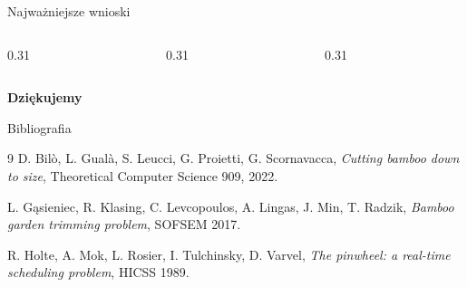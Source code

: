 \documentclass[aspectratio=169,10pt]{beamer}
\newcommand{\callout}[4]{%
  \node[
    rounded corners=6pt,
    fill=#1,
    draw=#2,
    line width=0.7pt,
    text width=#3,
    align=left,
    inner sep=8pt
  ] {#4};
}
\begin{document}
\begin{frame}{Najważniejsze wnioski}
  \vspace{0.35cm}
  \begin{columns}[T,onlytextwidth]
    \begin{column}{0.31\textwidth}
    \end{column}
    \begin{column}{0.31\textwidth}
    \end{column}
    \begin{column}{0.31\textwidth}
    \end{column}
  \end{columns}

  \vspace{0.82cm}
  \centering
  {\Large\bfseries Dziękujemy}
\end{frame}

\begin{frame}{Bibliografia}
  \small
  \begin{thebibliography}{9}
    D. Bilò, L. Gualà, S. Leucci, G. Proietti, G. Scornavacca,
    \textit{Cutting bamboo down to size}, Theoretical Computer Science 909, 2022.

    L. Gąsieniec, R. Klasing, C. Levcopoulos, A. Lingas, J. Min, T. Radzik,
    \textit{Bamboo garden trimming problem}, SOFSEM 2017.

    R. Holte, A. Mok, L. Rosier, I. Tulchinsky, D. Varvel,
    \textit{The pinwheel: a real-time scheduling problem}, HICSS 1989.
  \end{thebibliography}
\end{frame}
\end{document}
